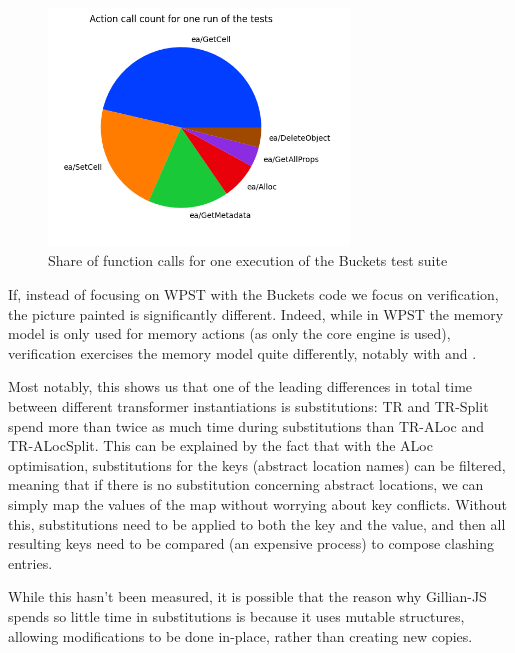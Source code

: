 \begin{figure}
	\centering
	\includegraphics[width=8cm]{figures/js-callcount-buckets.png}
	\caption{Share of function calls for one execution of the Buckets test suite}
	\label{fig:js-callcount-buckets}
\end{figure}

If, instead of focusing on WPST with the Buckets code we focus on verification, the picture painted is significantly different. Indeed, while in WPST the memory model is only used for memory actions (as only the core engine is used), verification exercises the memory model quite differently, notably with \produce{} and \consume{}.

Most notably, this shows us that one of the leading differences in total time between different transformer instantiations is substitutions: TR and TR-Split spend more than twice as much time during substitutions than TR-ALoc and TR-ALocSplit. This can be explained by the fact that with the ALoc optimisation, substitutions for the keys (abstract location names) can be filtered, meaning that if there is no substitution concerning abstract locations, we can simply map the values of the map without worrying about key conflicts. Without this, substitutions need to be applied to both the key and the value, and then all resulting keys need to be compared (an expensive process) to compose clashing entries. 

While this hasn't been measured, it is possible that the reason why Gillian-JS spends so little time in substitutions is because it uses mutable structures, allowing modifications to be done in-place, rather than creating new copies.

